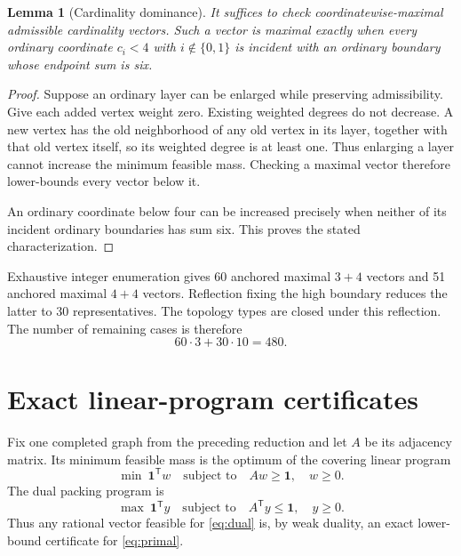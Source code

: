 \documentclass[11pt]{article}
\newtheorem{lemma}[theorem]{Lemma}
\theoremstyle{remark}
\newcommand{\one}{\mathbf 1}
\begin{document}
\begin{lemma}[Cardinality dominance]\label{lem:dominance}
It suffices to check coordinatewise-maximal admissible cardinality vectors.
Such a vector is maximal exactly when every ordinary coordinate $c_i<4$
with $i\notin\{0,1\}$ is incident with an ordinary boundary whose endpoint
sum is six.
\end{lemma}

\begin{proof}
Suppose an ordinary layer can be enlarged while preserving admissibility.
Give each added vertex weight zero.  Existing weighted degrees do not
decrease.  A new vertex has the old neighborhood of any old vertex in its
layer, together with that old vertex itself, so its weighted degree is at
least one.  Thus enlarging a layer cannot increase the minimum feasible mass.
Checking a maximal vector therefore lower-bounds every vector below it.

An ordinary coordinate below four can be increased precisely when neither of
its incident ordinary boundaries has sum six.  This proves the stated
characterization.
\end{proof}

Exhaustive integer enumeration gives 60 anchored maximal $3+4$ vectors and
51 anchored maximal $4+4$ vectors.  Reflection fixing the high boundary
reduces the latter to 30 representatives.  The topology types are closed
under this reflection.  The number of remaining cases is therefore
\[
 60\cdot3+30\cdot10=480.
\]

\section{Exact linear-program certificates}

Fix one completed graph from the preceding reduction and let $A$ be its
adjacency matrix.  Its minimum feasible mass is the optimum of the covering
linear program
\begin{equation}\label{eq:primal}
 \min\ \one^{\mathsf T}w
 \quad\text{subject to}\quad Aw\geq\one,\quad w\geq0.
\end{equation}
The dual packing program is
\begin{equation}\label{eq:dual}
 \max\ \one^{\mathsf T}y
 \quad\text{subject to}\quad A^{\mathsf T}y\leq\one,\quad y\geq0.
\end{equation}
Thus any rational vector feasible for \eqref{eq:dual} is, by weak duality, an
exact lower-bound certificate for \eqref{eq:primal}.
\end{document}
